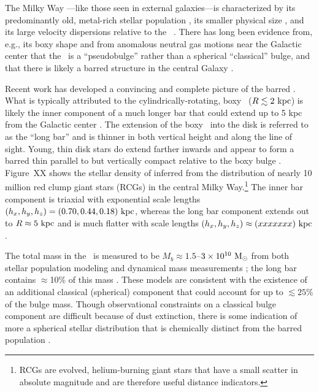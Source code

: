 
The Milky Way \mwbulge---like those seen in external galaxies---is characterized by its predominantly old, metal-rich stellar population \citep[$t_{\rm age} \approx 10~{\rm Gyr}$, typical todo $Fe/H \approx XX$--$YY$;][]{todo}, its smaller physical size \citep[$R \lesssim 1$--$2~\kpc$;][]{todo}, and its large velocity dispersions relative to the \mwdisk\ \citep[$\sigma_v \sim 100~\kms$;][]{todo}. There has long been evidence from, e.g., its boxy shape and from anomalous neutral gas motions near the Galactic center that the \mwbulge\ is a ``pseudobulge'' rather than a spherical ``classical'' bulge, and that there is likely a barred structure in the central Galaxy \citep{blitz91, binney91, weiland94, binney97}. 

Recent work has developed a convincing and complete picture of the barred \mwbulge. What is typically attributed to the cylindrically-rotating, boxy \mwbulge\ ($R \lesssim 2~\mathrm{kpc}$) is likely the inner component of a much longer bar that could extend up to 5 kpc from the Galactic center \citep{wegg13, todo}. The extension of the boxy \mwbulge\ into the disk is referred to as the ``long bar'' and is thinner in both vertical height and along the line of sight. Young, thin disk stars do extend farther inwards and appear to form a barred thin parallel to but vertically compact relative to the boxy bulge \citep{dekany15 todo}. Figure~XX shows the stellar density of  inferred from the distribution of nearly 10 million red clump giant stars (RCGs) in the central Milky Way.\footnote{RCGs are evolved, helium-burning giant stars that have a small scatter in absolute magnitude and are therefore useful distance indicators.} The inner bar component is triaxial with exponential scale lengths $(h_x, h_y, h_z) = (0.70, 0.44, 0.18)~\mathrm{kpc}$, whereas the long bar component extends out to $R\approx 5~\mathrm{kpc}$ and is much flatter with scale lengths $(h_x, h_y, h_z) \approx (xxxxxxx)~\mathrm{kpc}$ \citep{wegg13}. 

The total mass in the \mwbulge\ is measured to be $M_b \approx 1.5$--$3 \times 10^{10}~\mathrm{M}_\odot$ from both stellar population modeling \citep{dwek95, valenti15} and dynamical mass measurements \citep{zhao94, portail15}; the long bar contains $\approx$10\% of this mass \citep{wegg15}. These models are consistent with the existence of an additional classical (spherical) component that could account for up to $\lesssim 25\%$ of the bulge mass. Though observational constraints on a classical bulge component are difficult because of dust extinction, there is some indication of more a spherical stellar distribution that is chemically distinct from the barred population \citep{ness13a,ness13b, todo}.

